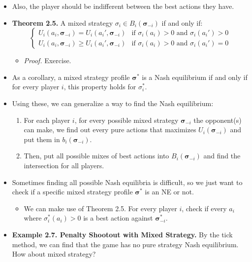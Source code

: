 \documentclass[notitlepage]{article}
\begin{document}
\begin{itemize}
    \[
    B_i(\boldsymbol{\sigma}_{-i}) = \{\sigma_i \in \Delta(A_i) : \sigma_i(a_i) = 0 \text{ if } a_i \notin b_i(\boldsymbol{\sigma}_{-i})
    \]
    \item Also, the player should be indifferent between the best actions they have.
    \item \textbf{Theorem 2.5.} A mixed strategy \(\sigma_i \in B_i(\boldsymbol{\sigma}_{-i})\) if and only if:
    \[
    \begin{cases}
        U_i(a_i, \boldsymbol{\sigma}_{-i}) = U_i(a_i', \boldsymbol{\sigma}_{-i}) &\text{if } \sigma_i(a_i) > 0 \text{ and } \sigma_i(a_i') > 0 \\
        U_i(a_i, \boldsymbol{\sigma}_{-i}) \ge U_i(a_i', \boldsymbol{\sigma}_{-i}) &\text{if } \sigma_i(a_i) > 0 \text{ and } \sigma_i(a_i') = 0
    \end{cases}
    \]
    \begin{itemize}
        \item \textit{Proof.} Exercise.
    \end{itemize}
    \item As a corollary, a mixed strategy profile \(\boldsymbol{\sigma}^*\) is a Nash equilibrium if and only if for every player \(i\), this property holds for \(\sigma^*_i\).
    \item Using these, we can generalize a way to find the Nash equilibrium:
    \begin{enumerate}
        \item For each player \(i\), for every possible mixed strategy \(\boldsymbol{\sigma}_{-i}\) the opponent(s) can make, we find out every pure actions that maximizes \(U_i(\boldsymbol{\sigma}_{-i})\) and put them in \(b_i(\boldsymbol{\sigma}_{-i})\).
        \item Then, put all possible mixes of best actions into \(B_i(\boldsymbol{\sigma}_{-i})\) and find the intersection for all players.
    \end{enumerate}
    \item Sometimes finding all possible Nash equilibria is difficult, so we just want to check if a specific mixed strategy profile \(\boldsymbol{\sigma}^*\) is an NE or not.
    \begin{itemize}
        \item We can make use of Theorem 2.5. For every player \(i\), check if every \(a_i\) where \(\sigma^*_i(a_i)>0\) is a best action against \(\boldsymbol{\sigma}^*_{-i}\).
    \end{itemize}
    \item \textbf{Example 2.7. Penalty Shootout with Mixed Strategy.} By the tick method, we can find that the game has no pure strategy Nash equilibrium. How about mixed strategy?

\end{itemize}
\end{document}
